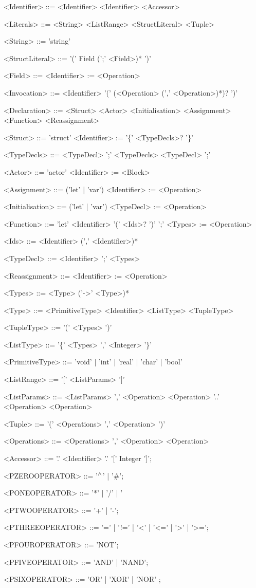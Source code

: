 \begin{grammar}
<Identifier> ::= <Identifier>
 \alt <Identifier> <Accessor>

<Literals> ::= <String>
 \alt <ListRange>
 \alt <StructLiteral>
 \alt <Tuple>

<String> ::= 'string'

<StructLiteral> ::= '(' Field (';' <Field>)* ')'

<Field> ::= <Identifier> := <Operation> 

<Invocation> ::= <Identifier> '(' (<Operation> (',' <Operation>)*)? ')'

<Declaration> ::= <Struct>
 \alt <Actor>
 \alt <Initialisation>
 \alt <Assignment>
 \alt <Function>
 \alt <Reassignment>

<Struct> ::= 'struct' <Identifier> := '\{' <TypeDecls>? '\}'

<TypeDecls> ::= <TypeDecl> ';' <TypeDecls>
 \alt <TypeDecl> ';'

<Actor> ::= 'actor' <Identifier> := <Block>

<Assignment> ::= ('let' | 'var') <Identifier> := <Operation>

<Initialisation> ::= ('let' | 'var') <TypeDecl> := <Operation>

<Function> ::= 'let' <Identifier> '(' <Ids>? ')' ';' <Types> := <Operation>

<Ids> ::= <Identifier> (',' <Identifier>)*

<TypeDecl> ::= <Identifier> ';' <Types>

<Reassignment> ::= <Identifier> := <Operation>

<Types> ::= <Type> ('->' <Type>)*

<Type> ::= <PrimitiveType>
 \alt <Identifier>
 \alt <ListType>
 \alt <TupleType>

<TupleType> ::= '(' <Types> ')'

<ListType> ::= '\{' <Types> ',' <Integer> '\}'

<PrimitiveType> ::= 'void' | 'int' | 'real' | 'char' | 'bool'

<ListRange> ::= '[' <ListParams> ']'

<ListParams> ::= <ListParams> ',' <Operation>
 \alt <Operation> '..' <Operation>
 \alt <Operation>

<Tuple> ::= '(' <Operations> ',' <Operation> ')'

<Operations> ::= <Operations> ',' <Operation>
 \alt <Operation>

<Accessor> ::= '.' <Identifier>
 \alt '.' '[' Integer ']';

<PZEROOPERATOR> ::= '$\mathbin{^\wedge{}}$' | '\#';

<PONEOPERATOR> ::= '*' | '/' | '%

<PTWOOPERATOR> ::= '+' | '-';

<PTHREEOPERATOR> ::= '=' | '!=' | '<' | '<=' | '>' | '>=';

<PFOUROPERATOR> ::= 'NOT';

<PFIVEOPERATOR> ::= 'AND' | 'NAND';

<PSIXOPERATOR> ::= 'OR' | 'XOR' | 'NOR' ;

\end{grammar}
